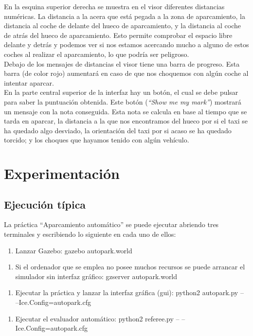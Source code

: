 En la esquina superior derecha se muestra en el visor diferentes distancias numéricas. La distancia a la acera que está pegada a la zona de aparcamiento, la distancia al coche de delante del hueco de aparcamiento, y la distancia al coche de atrás del hueco de aparcamiento. Esto permite comprobar el espacio libre delante y detrás y podemos ver si nos estamos acercando mucho a alguno de estos coches al realizar el aparcamiento, lo que podría ser peligroso.\\

Debajo de los mensajes de distancias el visor tiene una barra de progreso. Esta barra (de color rojo) aumentará en caso de que nos choquemos con algún coche al intentar aparcar. \\


En la parte central superior de la interfaz hay un botón, el cual se debe pulsar para saber la puntuación obtenida. Este botón (\textit{``Show me my mark''}) mostrará un mensaje con la nota conseguida. Esta nota se calcula en base al tiempo que se tarda en aparcar, la distancia a la que nos encontramos del hueco por si el taxi se ha quedado algo desviado, la orientación del taxi por si acaso se ha quedado torcido; y los choques que hayamos tenido con algún vehículo. 



\section{Experimentación}

\subsection{Ejecución típica}
La práctica “Aparcamiento automático” se puede ejecutar abriendo tres terminales y escribiendo lo siguiente en cada uno de ellos:

\begin{enumerate}[1.]
\item Lanzar Gazebo: gazebo autopark.world
\end{enumerate}
\begin{enumerate}[1b.]
\item Si el ordenador que se emplea no posee muchos recursos se puede arrancar el simulador sin interfaz gráfico: gzserver autopark.world
\end{enumerate}
\begin{enumerate}[2.]
\item	Ejecutar la práctica y lanzar la interfaz gráfica (\acrshort{gui}): python2 autopark.py -- --Ice.Config=autopark.cfg
\end{enumerate}
\begin{enumerate}[3.]
\item	Ejecutar el evaluador automático: python2 referee.py -- --Ice.Config=autopark.cfg
\end{enumerate}

